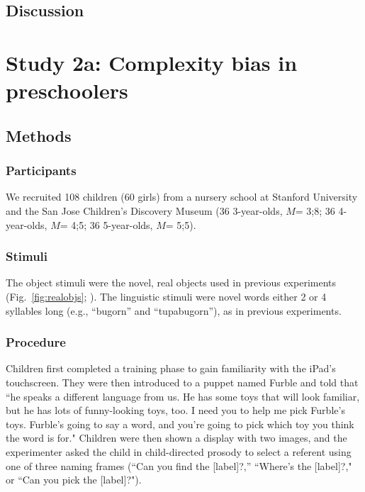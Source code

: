 \subsection{Discussion}

\section{Study 2a: Complexity bias in preschoolers }

\subsection{Methods}
\subsubsection{Participants} We recruited 108 children (60 girls) from a nursery school at Stanford University and the San Jose Children's Discovery Museum (36 3-year-olds, $M$= 3;8; 36 4-year-olds, $M$= 4;5; 36 5-year-olds, $M$= 5;5). \\
\subsubsection{Stimuli} 
The object stimuli were the novel, real objects used in previous experiments (Fig.\ \ref{fig:realobjs};  \pageref{novelrealobjs}). The linguistic stimuli were novel words either 2 or 4 syllables long (e.g., ``bugorn'' and ``tupabugorn''), as in previous experiments.

\subsubsection{Procedure} 
Children first completed a training phase to gain familiarity with  the iPad's touchscreen. They were then introduced to a puppet named Furble and told that  ``he speaks a different language from us. He has some toys that will look familiar, but he has lots of funny-looking toys, too. I need you to help me pick Furble's toys. Furble's going to say a word, and you're going to pick which toy you think the word is for." Children were then shown a display with two images, and the experimenter  asked the child in child-directed prosody to select a referent using one of three naming frames (``Can you find the [label]?,'' ``Where's the [label]?,"  or ``Can you pick the [label]?").

